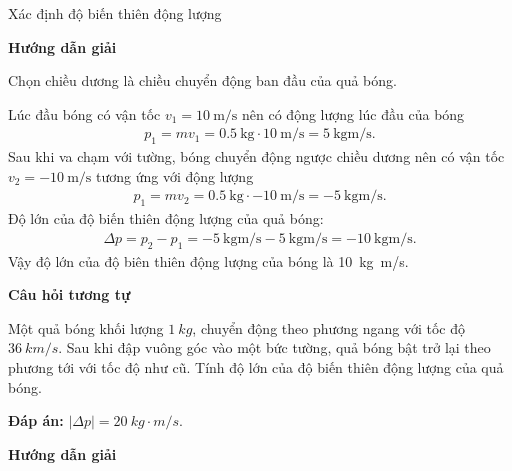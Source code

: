 \begin{dang}{Xác định độ biến thiên động lượng}
	{	\begin{center}
			\textbf{Hướng dẫn giải}
		\end{center}
		Chọn chiều dương là chiều chuyển động ban đầu của quả bóng. 
		
		Lúc đầu bóng có vận tốc $v_1=\SI{10}{\meter/\second}$ nên có động lượng lúc đầu của bóng 
		\begin{align*}
			p_1=mv_1=\SI{0.5}{\kilogram}\cdot\SI{10}{\meter/\second}=\SI{5}{\kilogram\meter/\second}.
		\end{align*} 
		Sau khi va chạm với tường, bóng chuyển động ngược chiều dương nên có vận tốc $v_2=\SI{-10}{\meter/\second}$ tương ứng với động lượng 
		\begin{align*}
			p_1=mv_2=\SI{0.5}{\kilogram}\cdot\SI{-10}{\meter/\second}=\SI{-5}{\kilogram\meter/\second}.
		\end{align*}
		Độ lớn của độ biến thiên động lượng của quả bóng:
		\begin{align*}
			\Delta p=p_2-p_1=\SI{-5}{\kilogram\meter/\second}-\SI{5}{\kilogram\meter/\second}=\SI{-10}{\kilogram\meter/\second}.
		\end{align*}
		Vậy độ lớn của độ biên thiên động lượng của bóng là \SI{10}{\kilogram \meter/\second}.
		
		
		\begin{center}
			\textbf{Câu hỏi tương tự}
		\end{center}
		
		Một quả bóng khối lượng $\SI{1}{kg}$, chuyển động theo phương ngang với tốc độ $\SI{36}{km/s}$. Sau khi đập vuông góc vào một bức tường, quả bóng bật trở lại theo phương tới với tốc độ như cũ. Tính độ lớn của độ biến thiên động lượng của quả bóng.
		
		\textbf{Đáp án:} $|\Delta p|=\SI{20}{kg\cdot m/s}$.
	}
	{	\begin{center}
			\textbf{Hướng dẫn giải}
		\end{center}
		
}
\end{dang}
